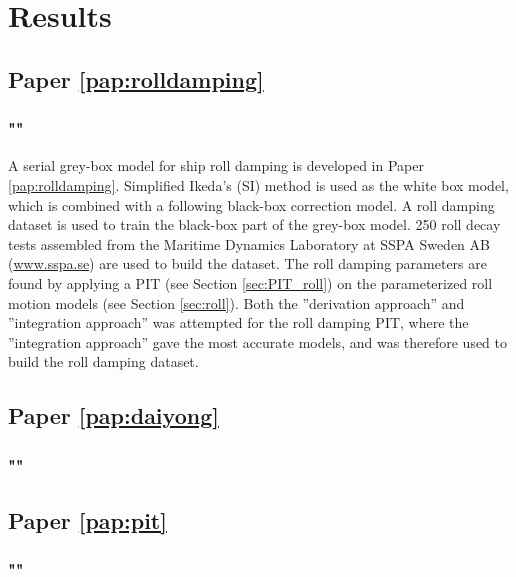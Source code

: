 \chapter{Results\label{ch:results}}

\section{Paper \ref{pap:rolldamping}}
\subsection*{""}
A serial grey-box model for ship roll damping is developed in Paper \ref{pap:rolldamping}. Simplified Ikeda's (SI) method \cite{kawahara_simple_2011} is used as the white box model, which is combined with a following black-box correction model.
A roll damping dataset is used to train the black-box part of the grey-box model.
250 roll decay tests assembled from the Maritime Dynamics Laboratory at SSPA Sweden AB (\href{www.sspa.se}{www.sspa.se}) are used to build the dataset. The roll damping parameters are found by applying a PIT (see Section \ref{sec:PIT_roll}) on the parameterized roll motion models (see Section \ref{sec:roll}).
Both the ''derivation approach'' and ''integration approach'' was attempted for the roll damping PIT, where the ''integration approach'' gave the most accurate models, and was therefore used to build the roll damping dataset.

\section{Paper \ref{pap:daiyong}}
\subsection*{""}

\section{Paper \ref{pap:pit}}
\subsection*{""}

